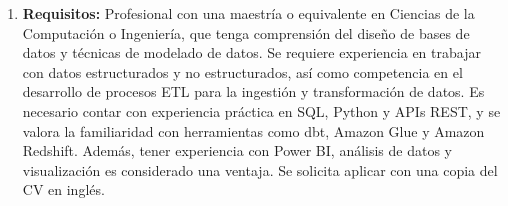 \documentclass[12pt]{article}
\begin{document}
\begin{enumerate}
                    \item \textbf{Requisitos:}
                        Profesional con una maestría o equivalente en Ciencias de la Computación o Ingeniería, que tenga comprensión del diseño de bases de datos y técnicas de modelado de datos. Se requiere experiencia en trabajar con datos estructurados y no estructurados, así como competencia en el desarrollo de procesos ETL para la ingestión y transformación de datos. Es necesario contar con experiencia práctica en SQL, Python y APIs REST, y se valora la familiaridad con herramientas como dbt, Amazon Glue y Amazon Redshift. Además, tener experiencia con Power BI, análisis de datos y visualización es considerado una ventaja. Se solicita aplicar con una copia del CV en inglés.

                \end{enumerate}
\end{document}
